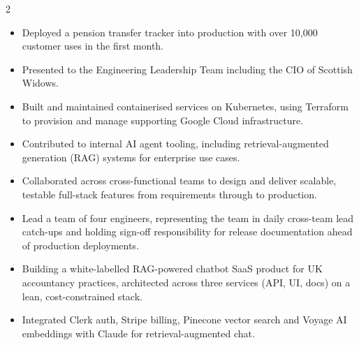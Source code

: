 \documentclass[10pt,a4paper,withhyper]{altacv}
\begin{document}

\makecvheader

\begin{paracol}{2}


\begin{itemize}
  \item Deployed a pension transfer tracker into production with over 10,000 customer uses in the first month.
  \item Presented to the Engineering Leadership Team including the CIO of Scottish Widows.
  \item %
  Built and maintained containerised services on Kubernetes, using Terraform to provision and manage supporting Google Cloud infrastructure.
  \item %
  Contributed to internal AI agent tooling, including retrieval-augmented generation (RAG) systems for enterprise use cases.
  \item %
  Collaborated across cross-functional teams to design and deliver scalable, testable full-stack features from requirements through to production.
  \item Lead a team of four engineers, representing the team in daily cross-team lead catch-ups and holding sign-off responsibility for release documentation ahead of production deployments.
\end{itemize}




\begin{itemize}
  \item Building a white-labelled RAG-powered chatbot SaaS product for UK accountancy practices, architected across three services (API, UI, docs) on a lean, cost-constrained stack.
  \item Integrated Clerk auth, Stripe billing, Pinecone vector search and Voyage AI embeddings with Claude for retrieval-augmented chat.
\end{itemize}


\end{paracol}
\end{document}
